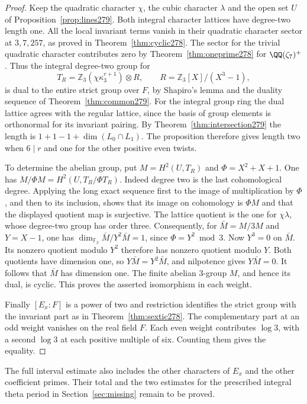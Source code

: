 \documentclass[a4paper,11pt]{article}
\theoremstyle{definition}
\theoremstyle{remark}
\newcommand{\ZZ}{\mathbb Z}\newcommand{\ord}{\operatorname{ord}}
\numberwithin{equation}{section}
\begin{document}
\begin{proof}
Keep the quadratic character \(\chi\), the cubic character
\(\lambda\) and the open set \(U\) of Proposition~\ref{prop:lines279}.
Both integral character lattices have degree-two length one.
All the local invariant terms vanish in their quadratic
character sector at \(3,7,257\), as proved in
Theorem~\ref{thm:cyclic278}. The sector for the trivial
quadratic character contributes zero by
Theorem~\ref{thm:oneprime278} for \(\QQ(\zeta_7)^+\).
Thus the integral degree-two group for
\[
       T_R=\ZZ_3(\chi\kappa_3^{r+1})\otimes R,\qquad
       R=\ZZ_3[X]/(X^3-1),
\]
is dual to the entire strict group over \(F\), by Shapiro's
lemma and the duality sequence of Theorem~\ref{thm:common279}.
For the integral group ring the dual lattice agrees with the
regular lattice, since the basis of group elements is orthonormal
for its invariant pairing. By Theorem~\ref{thm:intersection279}
the length is \(1+1-1+\dim(L_0\cap L_1)\). The proposition
therefore gives length two when \(6\mid r\) and one for the
other positive even twists.

To determine the abelian group, put \(M=H^2(U,T_R)\) and
\(\Phi=X^2+X+1\). One has \(M/\Phi M=H^2(U,T_R/\Phi T_R)\).
Indeed degree two is the last cohomological degree. Applying
the long exact sequence first to the image of multiplication
by \(\Phi\), and then to its inclusion, shows that its image
on cohomology is \(\Phi M\) and that the displayed quotient
map is surjective. The lattice quotient is the one for
\(\chi\lambda\), whose degree-two group has order three.
Consequently, for \(\bar M=M/3M\) and \(Y=X-1\), one has
\(\dim_{\mathbb F_3}\bar M/Y^2\bar M=1\), since
\(\Phi=Y^2\bmod3\).
Now \(Y^3=0\) on \(\bar M\). Its nonzero quotient modulo
\(Y^2\) therefore has nonzero quotient modulo \(Y\).
Both quotients have dimension one, so \(Y\bar M=Y^2\bar M\),
and nilpotence gives \(Y\bar M=0\). It follows that
\(\bar M\) has dimension one. The finite abelian \(3\)-group
\(M\), and hence its dual, is cyclic. This proves the asserted
isomorphism in each weight.

Finally \([E_x:F]\) is a power of two and restriction
identifies the strict group with the invariant part as in
Theorem~\ref{thm:sextic278}. The complementary part at an odd
weight vanishes on the real field \(F\). Each even weight
contributes \(\log3\), with a second \(\log3\) at each positive
multiple of six. Counting them gives the equality.
\end{proof}

The full interval estimate also includes the other characters
of \(E_x\) and the other coefficient primes. Their total and the
two estimates for the prescribed integral theta period in
Section~\ref{sec:missing} remain to be proved.
\end{document}
